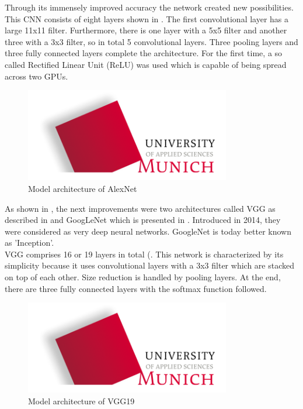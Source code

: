 Through its immensely improved accuracy the network created new possibilities. This CNN consists of eight layers shown in . The first convolutional layer has a large 11x11 filter. Furthermore, there is one layer with a 5x5 filter and another three with a 3x3 filter, so in total 5 convolutional layers. Three pooling layers and three fully connected layers complete the architecture. For the first time, a so called Rectified Linear Unit (ReLU) was used which is capable of being spread across two GPUs. \\

\begin{figure}[htbp]
\includegraphics[width=0.8\textwidth]{includes/MUASlogo}
\caption[Model architecture of AlexNet]{Model architecture of AlexNet \citep{He2016}}
\label{fig:FH-Logo2}
\end{figure}

As shown in , the next improvements were two architectures called VGG as described in \citet{Simonyan2015} and GoogLeNet which is presented in \citet{Szegedy2014}. Introduced in 2014, they were considered as very deep neural networks. GoogleNet is today better known as 'Inception'. \\

VGG comprises 16 or 19 layers in total (. This network is characterized by its simplicity because it uses convolutional layers with a 3x3 filter which are stacked on top of each other. Size reduction is handled by pooling layers. At the end, there are three fully connected layers with the softmax function followed.

\begin{figure}[htbp]
\includegraphics[width=0.8\textwidth]{includes/MUASlogo}
\caption[Model architecture of VGG19]{Model architecture of VGG19 \citep{He2016}}
\label{fig:FH-Logo3}
\end{figure}

